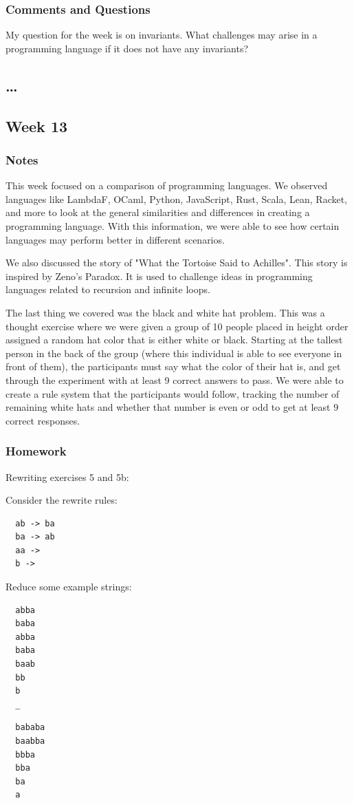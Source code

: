 \documentclass{article}
\theoremstyle{theorem}
\theoremstyle{definition}
\theoremstyle{remark}
\begin{document}
\subsubsection*{Comments and Questions}
My question for the week is on invariants. What challenges may arise in a programming
language if it does not have any invariants?
\subsection{\ldots}
\subsection{Week 13}
\subsubsection*{Notes}
This week focused on a comparison of programming languages. We observed languages like 
LambdaF, OCaml, Python, JavaScript, Rust, Scala, Lean, Racket, and more to look at the 
general similarities and differences in creating a programming language. With this information,
we were able to see how certain languages may perform better in different scenarios. 

We also
discussed the story of "What the Tortoise Said to Achilles". This story is inspired by 
Zeno's Paradox. It is used to challenge ideas in programming languages related to recursion and 
infinite loops. 

The last thing we covered was the black and white hat problem. This was a thought exercise where we were 
given a group of 10 people placed in height order assigned a random hat color that is either white or black. 
Starting at the tallest person in the back of the group (where this individual is able to see everyone in 
front of them), the participants must say what the color of their hat is, and get through the experiment 
with at least 9 correct answers to pass. We were able to create a rule system that the participants would 
follow, tracking the number of remaining white hats and whether that number is even or odd to get at least 
9 correct responses. 
\subsubsection*{Homework}
Rewriting exercises 5 and 5b:

Consider the rewrite rules:
\begin{verbatim}
  ab -> ba
  ba -> ab
  aa ->
  b ->
\end{verbatim}
Reduce some example strings:
\begin{verbatim}
  abba
  baba 
  abba 
  baba 
  baab 
  bb 
  b 
  _
\end{verbatim}
\begin{verbatim}
  bababa
  baabba 
  bbba 
  bba 
  ba 
  a 
\end{verbatim}
\end{document}
